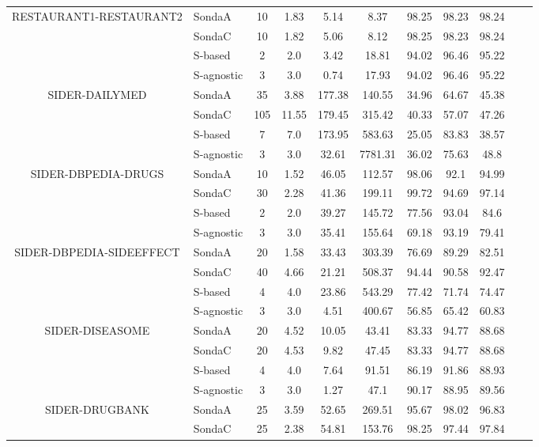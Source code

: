 \begin{center}
\begin{table}[h]
\begin{tabular}{|c|l|c|c|c|c|c|c|c|c|c|}
\multirow{4}{*}{RESTAURANT1-RESTAURANT2}  & SondaA  & 10 & 1.83   & 5.14  & 8.37 & 98.25 & 98.23 & 98.24  \\
 & SondaC  & 10 & 1.82   & 5.06  & 8.12 & 98.25 & 98.23 & 98.24  \\
 & S-based  & 2 & 2.0   & 3.42  & 18.81 & 94.02 & 96.46 & 95.22  \\
 & S-agnostic  & 3 & 3.0   & 0.74  & 17.93 & 94.02 & 96.46 & 95.22  \\ \hline
\multirow{4}{*}{SIDER-DAILYMED}  & SondaA  & 35 & 3.88   & 177.38  & 140.55 & 34.96 & 64.67 & 45.38  \\
 & SondaC  & 105 & 11.55   & 179.45  & 315.42 & 40.33 & 57.07 & 47.26  \\
 & S-based  & 7 & 7.0   & 173.95  & 583.63 & 25.05 & 83.83 & 38.57  \\
 & S-agnostic  & 3 & 3.0   & 32.61  & 7781.31 & 36.02 & 75.63 & 48.8  \\ \hline
\multirow{4}{*}{SIDER-DBPEDIA-DRUGS}  & SondaA  & 10 & 1.52   & 46.05  & 112.57 & 98.06 & 92.1 & 94.99  \\
 & SondaC  & 30 & 2.28   & 41.36  & 199.11 & 99.72 & 94.69 & 97.14  \\
 & S-based  & 2 & 2.0   & 39.27  & 145.72 & 77.56 & 93.04 & 84.6  \\
 & S-agnostic  & 3 & 3.0   & 35.41  & 155.64 & 69.18 & 93.19 & 79.41  \\ \hline
\multirow{4}{*}{SIDER-DBPEDIA-SIDEEFFECT}  & SondaA  & 20 & 1.58   & 33.43  & 303.39 & 76.69 & 89.29 & 82.51  \\
 & SondaC  & 40 & 4.66   & 21.21  & 508.37 & 94.44 & 90.58 & 92.47  \\
 & S-based  & 4 & 4.0   & 23.86  & 543.29 & 77.42 & 71.74 & 74.47  \\
 & S-agnostic  & 3 & 3.0   & 4.51  & 400.67 & 56.85 & 65.42 & 60.83  \\ \hline
\multirow{4}{*}{SIDER-DISEASOME}  & SondaA  & 20 & 4.52   & 10.05  & 43.41 & 83.33 & 94.77 & 88.68  \\
 & SondaC  & 20 & 4.53   & 9.82  & 47.45 & 83.33 & 94.77 & 88.68  \\
 & S-based  & 4 & 4.0   & 7.64  & 91.51 & 86.19 & 91.86 & 88.93  \\
 & S-agnostic  & 3 & 3.0   & 1.27  & 47.1 & 90.17 & 88.95 & 89.56  \\ \hline
\multirow{4}{*}{SIDER-DRUGBANK}  & SondaA  & 25 & 3.59   & 52.65  & 269.51 & 95.67 & 98.02 & 96.83  \\
 & SondaC  & 25 & 2.38   & 54.81  & 153.76 & 98.25 & 97.44 & 97.84  \\

\end{tabular}
\end{table}
\end{center}
